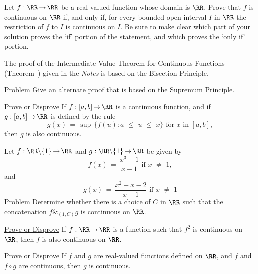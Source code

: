 \noindent \ExDe Let $f:{\RR} \,{\rightarrow}\, {\RR}$ be a real-valued function whose domain is ${\RR}$.
    Prove that $f$ is continuous on ${\RR}$ if, and only if, for every bounded open interval $I$ in ${\RR}$ the restriction of $f$ to $I$ is continuous on $I$.
    Be sure to make clear which part of your solution proves the `if' portion of the statement, and which proves the `only if' portion.

\V
\V

\noindent \ExDf The proof of the Intermediate-Value Theorem for Continuous Functions (Theorem~) %
    given in the {\em Notes} is based on the Bisection Principle.

        \underline{Problem} Give an alternate proof that is based on the Supremum Principle.

\V
\V

\noindent \ExDg \underline{Prove or Disprove} If $f:[a,b] \,{\rightarrow}\, {\RR}$ is a continuous function,
    and if $g:[a,b] \,{\rightarrow}\, {\RR}$ is defined by the rule
        \begin{displaymath}
        g(x) \,=\, {\sup}\,\{f(u):a\,\,{\leq}\,\,u\,\,{\leq}\,\,x\} \mbox{ for $x$ in $[a,b]$},
        \end{displaymath}
    then $g$ is also continuous.

\V
\V

\noindent \ExDh Let $f:{\RR}{\setminus}\{1\} \,{\rightarrow}\, {\RR}$ and $g:{\RR}{\setminus}\{1\} \,{\rightarrow}\, {\RR}$ be given by
        \begin{displaymath}
        f(x) \,=\, \frac{x^{3} - 1}{x-1} \mbox{ if $x \,\,{\neq}\,\, 1$},
        \end{displaymath}
    and
        \begin{displaymath}
        g(x) \,=\, \frac{x^{2} + x - 2}{x-1} \mbox{ if $x \,\,{\neq}\,\, 1$}
        \end{displaymath}
    \underline{Problem} Determine whether there is a choice of $C$ in ${\RR}$ such that the concatenation $f\&_{(1,C)}g$ is continuous on ${\RR}$.

\V
\V

\noindent \ExDi \underline{Prove or Disprove} If $f:{\RR} \,{\rightarrow}\, {\RR}$ is a function such that $f^{2}$ is continuous on ${\RR}$, then $f$ is also continuous on ${\RR}$.

\V
\V

\noindent \ExDj \underline{Prove or Disprove} If $f$ and $g$ are real-valued functions defined on ${\RR}$,
    and $f$ and $f{\circ}g$ are continuous, then $g$ is continuous.


